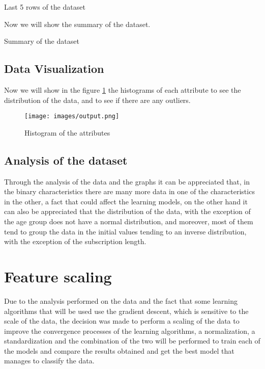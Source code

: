 \documentclass{article}
\theoremstyle{mytheoremstyle}
\theoremstyle{mytheoremstyle}
\theoremstyle{myproblemstyle}
\begin{document}
\begin{table}[h]
  \centering
  \caption{Last 5 rows of the dataset}
\end{table}

Now we will show the summary of the dataset.

\newpage

\begin{table}[h]
  \centering
  \caption{Summary of the dataset}
\end{table}

\subsection*{Data Visualization}

Now we will show in the figure \ref{fig:output} the histograms of each attribute to see the distribution of the data, and to see if there are any outliers.

\begin{figure}
  \centering
  \texttt{[image: images/output.png]}
  \caption{Histogram of the attributes}
  \label{fig:output}
\end{figure}

\subsection*{Analysis of the dataset}

Through the analysis of the data and the graphs it can be appreciated that, in the binary characteristics there are many more data in one of the characteristics in the other, a fact that could affect the learning models, on the other hand it can also be appreciated that the distribution of the data, with the exception of the age group does not have a normal distribution, and moreover, most of them tend to group the data in the initial values tending to an inverse distribution, with the exception of the subscription length.

\section*{Feature scaling}

Due to the analysis performed on the data and the fact that some learning algorithms that will be used use the gradient descent, which is sensitive to the scale of the data, the decision was made to perform a scaling of the data to improve the convergence processes of the learning algorithms, a normalization, a standardization and the combination of the two will be performed to train each of the models and compare the results obtained and get the best model that manages to classify the data.
\end{document}
